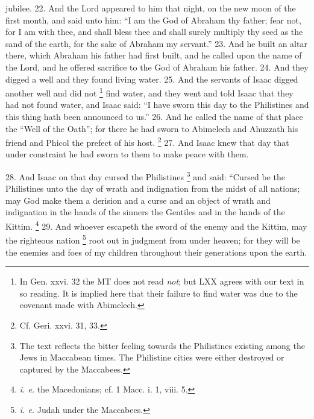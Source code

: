 jubilee. 22. And the Lord appeared to him that night, on the new moon of the first month, and said unto him: ``I am the God of Abraham thy father; fear not, for I am with thee, and shall bless thee and shall surely multiply thy seed as the sand of the earth, for the sake of Abraham my servant.'' 23. And he built an altar there, which Abraham his father had first built, and he called upon the name of the Lord, and he offered sacrifice to the God of Abraham his father. 24. And they digged a well and they found living water. 25. And the servants of Isaac digged another well and did not \footnote{In Gen. xxvi. 32 the MT does not read \emph{not}; but LXX agrees with our text in so reading. It is implied here that their failure to find water was due to the covenant made with Abimelech.} find water, and they went and told Isaac that they had not found water, and Isaac said: ``I have sworn this day to the Philistines and this thing hath been announced to us.'' 26. And he called the name of that place the ``Well of the Oath''; for there he had sworn to Abimelech and Ahuzzath his friend and Phicol the prefect of his host. \footnote{Cf. Geri. xxvi. 31, 33.} 27. And Isaac knew that day that under constraint he had sworn to them to make peace with them.


28. And Isaac on that day cursed the Philistines \footnote{The text reflects the bitter feeling towards the Philistines existing among the Jews in Maccabean times. The Philistine cities were either destroyed or captured by the Maccabees.} and said: ``Cursed be the Philistines unto the day of wrath and indignation from the midst of all nations; may God make them a derision and a curse and an object of wrath and indignation in the hands of the sinners the Gentiles and in the hands of the Kittim. \footnote{\emph{i. e.} the Macedonians; cf. 1 Macc. i. 1, viii. 5.} 29. And whoever escapeth the sword of the enemy and the Kittim, may the righteous nation \footnote{\emph{i. e.} Judah under the Maccabees.} root out in judgment from under heaven; for they will be the enemies and foes of my children throughout their generations upon the earth.

